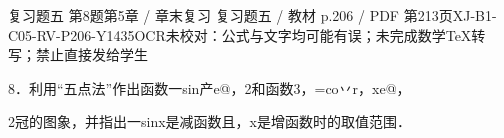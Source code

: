 \begin{bankitem}{复习题五 第8题}{第5章 / 章末复习 复习题五 / 教材 p.206 / PDF 第213页}{XJ-B1-C05-RV-P206-Y1435}{OCR未校对：公式与文字均可能有误；未完成数学TeX转写；禁止直接发给学生}
\begin{ocrdraft}
\par
8．利用“五点法”作出函数一sin产e@，2和函数3，=co丷r，xe@，
\par
2冠的图象，并指出一sinx是减函数且，x是增函数时的取值范围．
\end{ocrdraft}
\end{bankitem}
